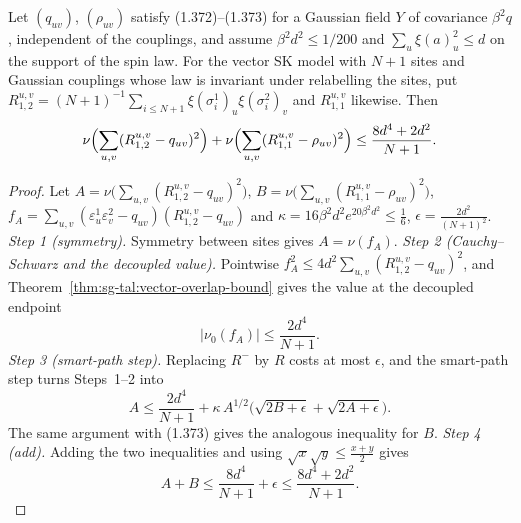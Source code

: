 \begin{theorem}\label{thm:sg-tal:vector-overlap-concentration}
\leanok
{}
Let $(q_{uv})$, $(\rho_{uv})$ satisfy (1.372)--(1.373) for a Gaussian field $Y$ of covariance $\beta^2q$, independent of the couplings, and assume $\beta^2d^2\le1/200$ and $\sum_u\xi(a)_u^2\le d$ on the support of the spin law. For the vector SK model with $N+1$ sites and Gaussian couplings whose law is invariant under relabelling the sites, put $R^{u,v}_{1,2}=(N+1)^{-1}\sum_{i\le N+1}\xi(\sigma^1_i)_u\xi(\sigma^2_i)_v$ and $R^{u,v}_{1,1}$ likewise. Then
\[
\nu\Bigl(\sum_{u,v}(R^{u,v}_{1,2}-q_{uv})^2\Bigr)+\nu\Bigl(\sum_{u,v}(R^{u,v}_{1,1}-\rho_{uv})^2\Bigr)\le\frac{8d^4+2d^2}{N+1}.
\]
\end{theorem}
\begin{proof}
\leanok
Let $A=\nu\big(\sum_{u,v}(R^{u,v}_{1,2}-q_{uv})^2\big)$, $B=\nu\big(\sum_{u,v}(R^{u,v}_{1,1}-\rho_{uv})^2\big)$, $f_A=\sum_{u,v}(\varepsilon^1_u\varepsilon^2_v-q_{uv})(R^{u,v}_{1,2}-q_{uv})$ and $\kappa=16\beta^2d^2e^{20\beta^2d^2}\le\frac16$, $\epsilon=\frac{2d^2}{(N+1)^2}$.
\emph{Step 1 (symmetry).} Symmetry between sites gives $A=\nu(f_A)$.
\emph{Step 2 (Cauchy--Schwarz and the decoupled value).} Pointwise $f_A^2\le4d^2\sum_{u,v}(R^{u,v}_{1,2}-q_{uv})^2$, and Theorem~\ref{thm:sg-tal:vector-overlap-bound} gives the value at the decoupled endpoint
\[
|\nu_0(f_A)|\le\frac{2d^4}{N+1}.
\]
\emph{Step 3 (smart-path step).} Replacing $R^-$ by $R$ costs at most $\epsilon$, and the smart-path step turns Steps~1--2 into
\[
A\le\frac{2d^4}{N+1}+\kappa\,A^{1/2}\Big(\sqrt{2B+\epsilon}+\sqrt{2A+\epsilon}\Big).
\]
The same argument with (1.373) gives the analogous inequality for $B$.
\emph{Step 4 (add).} Adding the two inequalities and using $\sqrt x\sqrt y\le\frac{x+y}2$ gives
\[
A+B\le\frac{8d^4}{N+1}+\epsilon\le\frac{8d^4+2d^2}{N+1}.
\]
\end{proof}

